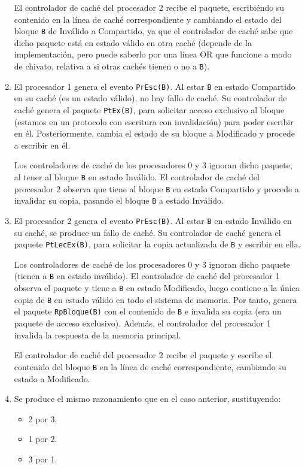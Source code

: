 \begin{ejercicio}
\begin{enumerate}
        El controlador de caché del procesador 2 recibe el paquete, escribiéndo su contenido en la línea de caché correspondiente y cambiando el estado del bloque \verb|B| de Inválido a Compartido, ya que el controlador de caché sabe que dicho paquete está en estado válido en otra caché (depende de la implementación, pero puede saberlo por una línea OR que funcione a modo de chivato, relativa a si otras cachés tienen o no a \verb|B|).

    \item El procesador 1 genera el evento \verb|PrEsc(B)|. Al estar \verb|B| en estado Compartido en su caché (es un estado válido), no hay fallo de caché. Su controlador de caché genera el paquete \verb|PtEx(B)|, para solicitar acceso exclusivo al bloque (estamos en un protocolo con escritura con invalidación) para poder escribir en él. Posteriormente, cambia el estado de su bloque a Modificado y procede a escribir en él.

        Los controladores de caché de los procesadores 0 y 3 ignoran dicho paquete, al tener al bloque \verb|B| en estado Inválido. El controlador de caché del procesador 2 observa que tiene al bloque \verb|B| en estado Compartido y procede a invalidar su copia, pasando el bloque \verb|B| a estado Inválido.

    \item El procesador 2 genera el evento \verb|PrEsc(B)|. Al estar \verb|B| en estado Inválido en su caché, se produce un fallo de caché. Su controlador de caché genera el paquete \verb|PtLecEx(B)|, para solicitar la copia actualizada de \verb|B| y escribir en ella.

        Los controladores de caché de los procesadores 0 y 3 ignoran dicho paquete (tienen a \verb|B| en estado inválido). El controlador de caché del procesador 1 observa el paquete y tiene a \verb|B| en estado Modificado, luego contiene a la única copia de \verb|B| en estado válido en todo el sistema de memoria. Por tanto, genera el paquete \verb|RpBloque(B)| con el contenido de \verb|B| e invalida su copia (era un paquete de acceso exclusivo). Además, el controlador del procesador 1 invalida la respuesta de la memoria principal.

        El controlador de caché del procesador 2 recibe el paquete y escribe el contenido del bloque \verb|B| en la línea de caché correspondiente, cambiando su estado a Modificado.
    
    \item Se produce el mismo razonamiento que en el caso anterior, sustituyendo:
        \begin{itemize}
            \item 2 por 3.
            \item 1 por 2.
            \item 3 por 1.
        \end{itemize}
\end{enumerate}

\end{ejercicio}

